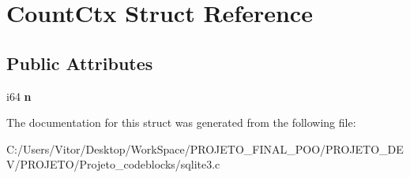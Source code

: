\hypertarget{struct_count_ctx}{\section{Count\-Ctx Struct Reference}
\label{struct_count_ctx}
}
\subsection*{Public Attributes}
\begin{DoxyCompactItemize}
\item 
\hypertarget{struct_count_ctx_a141c718918dbfaa183f772bfd7a516f4}{i64 {\bfseries n}}\label{struct_count_ctx_a141c718918dbfaa183f772bfd7a516f4}

\end{DoxyCompactItemize}


The documentation for this struct was generated from the following file\-:\begin{DoxyCompactItemize}
\item 
C\-:/\-Users/\-Vitor/\-Desktop/\-Work\-Space/\-P\-R\-O\-J\-E\-T\-O\-\_\-\-F\-I\-N\-A\-L\-\_\-\-P\-O\-O/\-P\-R\-O\-J\-E\-T\-O\-\_\-\-D\-E\-V/\-P\-R\-O\-J\-E\-T\-O/\-Projeto\-\_\-codeblocks/sqlite3.\-c\end{DoxyCompactItemize}
